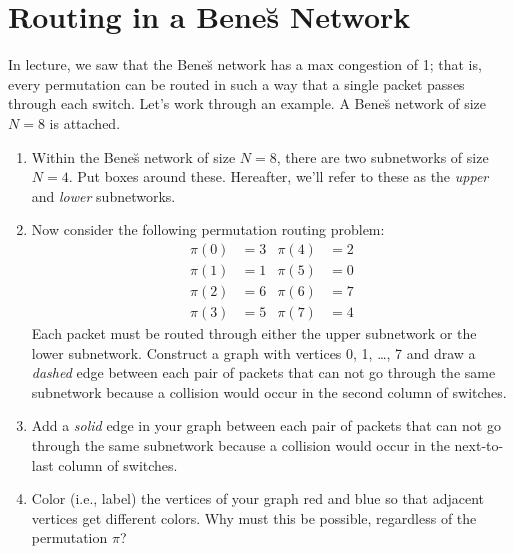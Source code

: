 \documentclass[12pt]{article}
\newcommand{\mfigure}[3]{\bigskip\centerline{\resizebox{#1}{#2}{\texttt{[image: \#3]}}}\bigskip}
\begin{document}
\instatements{\newpage}

\section*{Routing in a Bene\u{s} Network}

In lecture, we saw that the Bene\u{s} network has a max congestion of
1; that is, every permutation can be routed in such a way that a
single packet passes through each switch.  Let's work through an
example.  A Bene\u{s} network of size $N = 8$ is attached.

\begin{enumerate}
\item Within the Bene\u{s} network of size $N = 8$, there are two
subnetworks of size $N = 4$.  Put boxes around these.  Hereafter,
we'll refer to these as the \textit{upper} and \textit{lower}
subnetworks.

\solution{
\ \\
\mfigure{!}{2in}{benes-decomp}
}

\item Now consider the following permutation routing problem:
%
\begin{align*}
\pi(0) & = 3 & \pi(4) & = 2 \\
\pi(1) & = 1 & \pi(5) & = 0 \\
\pi(2) & = 6 & \pi(6) & = 7 \\
\pi(3) & = 5 & \pi(7) & = 4
\end{align*}
%
Each packet must be routed through either the upper subnetwork or the
lower subnetwork.  Construct a graph with vertices 0, 1, \ldots, 7 and
draw a \textit{dashed} edge between each pair of packets that can not
go through the same subnetwork because a collision would occur in the
second column of switches.

\solution{
\ \\
\mfigure{!}{2in}{rec-const1}
}

\item Add a \textit{solid} edge in your graph between each pair of
packets that can not go through the same subnetwork because a
collision would occur in the next-to-last column of switches.

\solution{
\ \\
\mfigure{!}{2in}{rec-const2}
}

\item Color (i.e., label) the vertices of your graph red and blue so
  that adjacent vertices get different colors.  Why must this be
  possible, regardless of the permutation $\pi$?


\end{enumerate}
\end{document}

